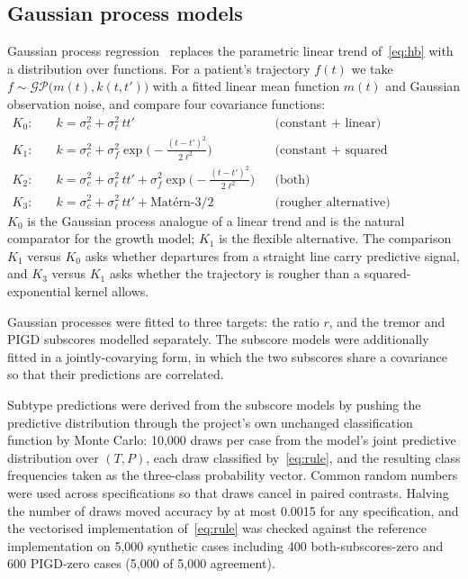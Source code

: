 \documentclass[11pt]{article}
\begin{document}
\subsection{Gaussian process models}
\label{sec:gp}
Gaussian process regression~\citep{rasmussen2006} replaces the parametric linear
trend of~\eqref{eq:hb} with a distribution over functions. For a patient's
trajectory $f(t)$ we take $f \sim \mathcal{GP}\bigl(m(t), k(t,t')\bigr)$ with a
fitted linear mean function $m(t)$ and Gaussian observation noise, and compare
four covariance functions:
\begin{align*}
K_0:&\quad k = \sigma_c^2 + \sigma_\ell^2\, t t'  &&\text{(constant + linear)}\\
K_1:&\quad k = \sigma_c^2 + \sigma_f^2 \exp\!\bigl(-\tfrac{(t-t')^2}{2\ell^2}\bigr) &&\text{(constant + squared exponential)}\\
K_2:&\quad k = \sigma_c^2 + \sigma_\ell^2\, t t' + \sigma_f^2 \exp\!\bigl(-\tfrac{(t-t')^2}{2\ell^2}\bigr) &&\text{(both)}\\
K_3:&\quad k = \sigma_c^2 + \sigma_\ell^2\, t t' + \text{Mat\'ern-}3/2 &&\text{(rougher alternative)}
\end{align*}
$K_0$ is the Gaussian process analogue of a linear trend and is the natural
comparator for the growth model; $K_1$ is the flexible alternative. The
comparison $K_1$ versus $K_0$ asks whether departures from a straight line carry
predictive signal, and $K_3$ versus $K_1$ asks whether the trajectory is rougher
than a squared-exponential kernel allows.

Gaussian processes were fitted to three targets: the ratio $r$, and the tremor
and PIGD subscores modelled separately. The subscore models were additionally
fitted in a jointly-covarying form, in which the two subscores share a
covariance so that their predictions are correlated.

Subtype predictions were derived from the subscore models by pushing the
predictive distribution through the project's own unchanged classification
function by Monte Carlo: 10,000 draws per case from the model's joint predictive
distribution over $(T, P)$, each draw classified by~\eqref{eq:rule}, and the
resulting class frequencies taken as the three-class probability vector. Common
random numbers were used across specifications so that draws cancel in paired
contrasts. Halving the number of draws moved accuracy by at most 0.0015 for any
specification, and the vectorised implementation of~\eqref{eq:rule} was checked
against the reference implementation on 5,000 synthetic cases including 400
both-subscores-zero and 600 PIGD-zero cases (5,000 of 5,000 agreement).
\end{document}
